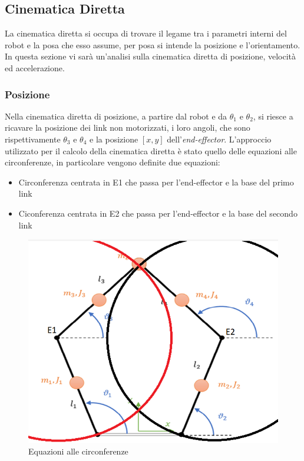 \subsection{Cinematica Diretta}
La cinematica diretta si occupa di trovare il legame tra i parametri interni del robot e la posa che esso assume, per posa si intende la posizione e l'orientamento. In questa sezione vi sarà un'analisi sulla cinematica diretta di posizione, velocità ed accelerazione.
\subsubsection{Posizione}\label{sec:Cinematica-pos}
Nella cinematica diretta di posizione, a partire dal robot e da $\theta_1$ e $\theta_2$, si riesce a ricavare la posizione dei link non motorizzati, i loro angoli, che sono rispettivamente $\theta_3$ e $\theta_4$ e la posizione $[x,y]$ dell'\textit{end-effector}.
L'approccio utilizzato per il calcolo della cinematica diretta è stato quello delle equazioni alle circonferenze, in particolare vengono definite due equazioni:
\begin{itemize}
	\item Circonferenza centrata in E1 che passa per l'end-effector e la base del primo link
	\item Ciconferenza centrata in E2 che passa per l'end-effector e la base del secondo link
\end{itemize}
\begin{figure}[ht]
	\begin{center}
		\includegraphics[scale=0.65]{Immagini/EqCirc}
		\caption{Equazioni alle circonferenze \label{fig:eqCirc}}
	\end{center}
\end{figure}
